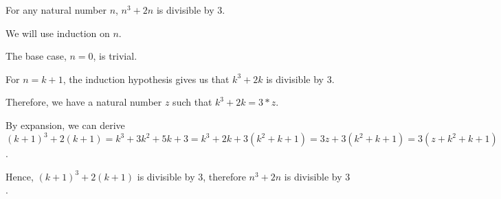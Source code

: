 For any natural number $n$, $n^3 + 2n$ is divisible by $3$.

We will use induction on $n$.

The base case, $n = 0$, is trivial.

For $n = k+1$, the induction hypothesis gives us that $k^3 + 2k$ is divisible by $3$.

Therefore, we have a natural number $z$ such that $k^3 + 2k = 3*z$.

By expansion, we can derive $(k+1)^3 + 2(k+1) = k^3 + 3k^2 + 5k + 3 = k^3 + 2k + 3(k^2 + k + 1) =3z + 3(k^2 + k + 1) = 3(z+k^2+k+1)$.

Hence, $(k+1)^3 + 2(k+1)$ is divisible by $3$, therefore $n^3 + 2n$ is divisible by $3$.
